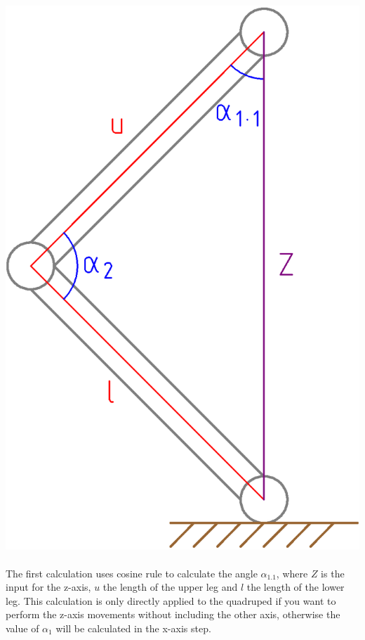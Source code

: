 \documentclass{article}
\begin{document}
    \paragraph{}
    \begin{center}
        \includegraphics[scale=0.2]{z-axis}
    \end{center}

    \paragraph{}
    The first calculation uses cosine rule to calculate the angle $\alpha_{1.1}$, where $Z$ is the input for the z-axis, $u$ the length of the upper leg and $l$ the length of the lower leg. This calculation is only directly applied to the quadruped if you want to perform the z-axis movements without including the other axis, otherwise the value of $\alpha_1$ will be calculated in the x-axis step.
\end{document}
